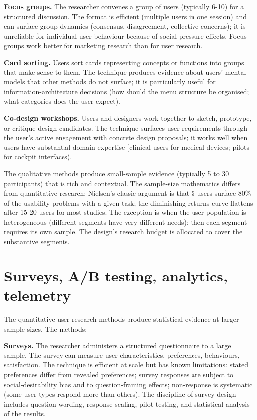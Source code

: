 \textbf{Focus groups.} The researcher convenes a group of users (typically 6-10) for a structured discussion. The format is efficient (multiple users in one session) and can surface group dynamics (consensus, disagreement, collective concerns); it is unreliable for individual user behaviour because of social-pressure effects. Focus groups work better for marketing research than for user research.

\textbf{Card sorting.} Users sort cards representing concepts or functions into groups that make sense to them. The technique produces evidence about users' mental models that other methods do not surface; it is particularly useful for information-architecture decisions (how should the menu structure be organised; what categories does the user expect).

\textbf{Co-design workshops.} Users and designers work together to sketch, prototype, or critique design candidates. The technique surfaces user requirements through the user's active engagement with concrete design proposals; it works well when users have substantial domain expertise (clinical users for medical devices; pilots for cockpit interfaces).

The qualitative methods produce small-sample evidence (typically 5 to 30 participants) that is rich and contextual. The sample-size mathematics differs from quantitative research: Nielsen's classic argument is that 5 users surface 80\% of the usability problems with a given task; the diminishing-returns curve flattens after 15-20 users for most studies. The exception is when the user population is heterogeneous (different segments have very different needs); then each segment requires its own sample. The design's research budget is allocated to cover the substantive segments.

\section{Surveys, A/B testing, analytics, telemetry}

The quantitative user-research methods produce statistical evidence at larger sample sizes. The methods:

\textbf{Surveys.} The researcher administers a structured questionnaire to a large sample. The survey can measure user characteristics, preferences, behaviours, satisfaction. The technique is efficient at scale but has known limitations: stated preferences differ from revealed preferences; survey responses are subject to social-desirability bias and to question-framing effects; non-response is systematic (some user types respond more than others). The discipline of survey design includes question wording, response scaling, pilot testing, and statistical analysis of the results.

